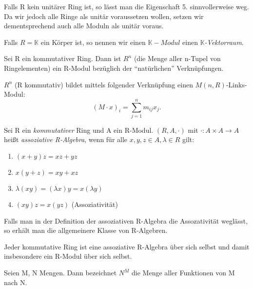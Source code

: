 \documentclass[10pt]{scrbook}
\begin{document}
\begin{Bem}
Falls R kein unitärer Ring ist, so lässt man die Eigenschaft 5. sinnvollerweise weg. Da wir jedoch alle Ringe als unitär voraussetzen wollen, setzen wir dementsprechend auch alle Moduln als unitär voraus.
\end{Bem}

\begin{Def}
Falls $R=\mathbb{K}$ ein Körper ist, so nennen wir einen $\mathbb{K}-Modul$ einen \emph{$\mathbb{K}$-Vektorraum}.
\end{Def}

\begin{Bsp}
Sei R ein kommutativer Ring. Dann ist $R^n$ (die Menge aller n-Tupel von Ringelementen) ein R-Modul bezüglich der "`natürlichen"' Verknüpfungen.
\end{Bsp}

\begin{Bsp}
$R^n$ (R kommutativ) bildet mittels folgender Verknüpfung einen $M(n, R)$-Links-Modul:
\begin{displaymath}
	(M\cdot x)_i=\sum\limits_{j=1}^n{m_{i j} x_j}.
\end{displaymath}
\end{Bsp}

\begin{Def}
Sei R ein \emph{kommutativer} Ring und A ein R-Modul. $(R, A, \cdot)$ mit $\cdot: A \times A \rightarrow A$ heißt \emph{assoziative R-Algebra}, wenn für alle $x, y, z\in A, \lambda \in R$ gilt:
\begin{enumerate}
  \item $(x+y) z=x z+y z$
  \item $x (y+z)=x y+x z$
  \item $\lambda (x y)=(\lambda x) y=x (\lambda y)$
  \item $(x y) z=x (y z)$ (Assoziativität)
\end{enumerate}
\end{Def}

\begin{Bem}
Falls man in der Definition der assoziativen R-Algebra die Assozativität weglässt, so erhält man die allgemeinere Klasse von R-Algebren.
\end{Bem}

\begin{Bsp}
Jeder kommutative Ring ist eine assoziative R-Algebra über sich selbst und damit insbesondere ein R-Modul über sich selbst.
\end{Bsp}

\begin{Def}
Seien M, N Mengen. Dann bezeichnet $N^M$ die Menge aller Funktionen von M nach N.
\end{Def}
\end{document}
